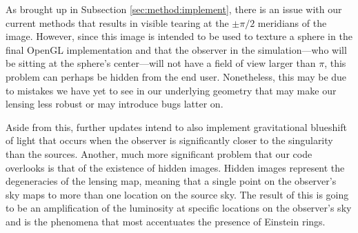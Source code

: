 \documentclass{standalone}
\begin{document}
As brought up in Subsection \ref{sec:method:implement}, there is an issue with our current methods that results in visible tearing at the $\pm\pi/2$ meridians of the image.
However, since this image is intended to be used to texture a sphere in the final OpenGL implementation and that the observer in the simulation---who will be sitting at the sphere's center---will not have a field of view larger than $\pi$, this problem can perhaps be hidden from the end user.
Nonetheless, this may be due to mistakes we have yet to see in our underlying geometry that may make our lensing less robust or may introduce bugs latter on.

Aside from this, further updates intend to also implement gravitational blueshift of light that occurs when the observer is significantly closer to the singularity than the sources.
Another, much more significant problem that our code overlooks is that of the existence of hidden images.
Hidden images represent the degeneracies of the lensing map, meaning that a single point on the observer's sky maps to more than one location on the source sky.
The result of this is going to be an amplification of the luminosity at specific locations on the observer's sky and is the phenomena that most accentuates the presence of Einstein rings.
\end{document}
